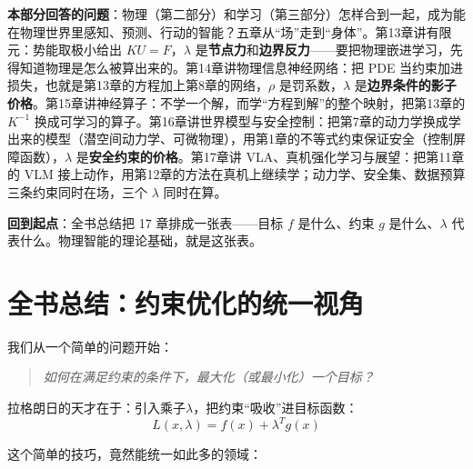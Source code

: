 \documentclass[11pt,a4paper,twoside,openright]{book}
\theoremstyle{definition}
\newenvironment{partintro}
{\begin{tcolorbox}[colback=gray!5, colframe=gray!50, boxrule=0.6pt, arc=2mm, left=8pt, right=8pt, top=6pt, bottom=6pt, title=本部分导读, fonttitle=\bfseries]}
{\end{tcolorbox}}
\begin{document}
\begin{partintro}
\textbf{本部分回答的问题}：物理（第二部分）和学习（第三部分）怎样合到一起，成为能在物理世界里感知、预测、行动的智能？五章从“场”走到“身体”。第13章讲有限元：势能取极小给出 $KU = F$，$\lambda$ 是\textbf{节点力}和\textbf{边界反力}——要把物理嵌进学习，先得知道物理是怎么被算出来的。第14章讲物理信息神经网络：把 PDE 当约束加进损失，也就是第13章的方程加上第8章的网络，$\rho$ 是罚系数，$\lambda$ 是\textbf{边界条件的影子价格}。第15章讲神经算子：不学一个解，而学“方程到解”的整个映射，把第13章的 $K^{-1}$ 换成可学习的算子。第16章讲世界模型与安全控制：把第7章的动力学换成学出来的模型（潜空间动力学、可微物理），用第1章的不等式约束保证安全（控制屏障函数），$\lambda$ 是\textbf{安全约束的价格}。第17章讲 VLA、真机强化学习与展望：把第11章的 VLM 接上动作，用第12章的方法在真机上继续学；动力学、安全集、数据预算三条约束同时在场，三个 $\lambda$ 同时在算。

\textbf{回到起点}：全书总结把 17 章排成一张表——目标 $f$ 是什么、约束 $g$ 是什么、$\lambda$ 代表什么。物理智能的理论基础，就是这张表。
\end{partintro}



\chapter*{全书总结：约束优化的统一视角}

我们从一个简单的问题开始：
\begin{quote}
\textit{如何在满足约束的条件下，最大化（或最小化）一个目标？}
\end{quote}

拉格朗日的天才在于：引入乘子$\lambda$，把约束“吸收”进目标函数：
\begin{equation}
L(x, \lambda) = f(x) + \lambda^T g(x)
\end{equation}

这个简单的技巧，竟然能统一如此多的领域：
\end{document}
